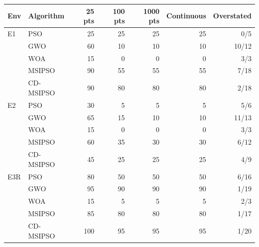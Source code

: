 \begin{tabular}{llrrrrr}
\hline
Env & Algorithm & 25 pts & 100 pts & 1000 pts & Continuous & Overstated \\
\hline
E1 & PSO & 25 & 25 & 25 & 25 & 0/5 \\
 & GWO & 60 & 10 & 10 & 10 & 10/12 \\
 & WOA & 15 & 0 & 0 & 0 & 3/3 \\
 & MSIPSO & 90 & 55 & 55 & 55 & 7/18 \\
 & CD-MSIPSO & 90 & 80 & 80 & 80 & 2/18 \\
\hline
E2 & PSO & 30 & 5 & 5 & 5 & 5/6 \\
 & GWO & 65 & 15 & 10 & 10 & 11/13 \\
 & WOA & 15 & 0 & 0 & 0 & 3/3 \\
 & MSIPSO & 60 & 35 & 30 & 30 & 6/12 \\
 & CD-MSIPSO & 45 & 25 & 25 & 25 & 4/9 \\
\hline
E3R & PSO & 80 & 50 & 50 & 50 & 6/16 \\
 & GWO & 95 & 90 & 90 & 90 & 1/19 \\
 & WOA & 15 & 5 & 5 & 5 & 2/3 \\
 & MSIPSO & 85 & 80 & 80 & 80 & 1/17 \\
 & CD-MSIPSO & 100 & 95 & 95 & 95 & 1/20 \\
\hline
\end{tabular}